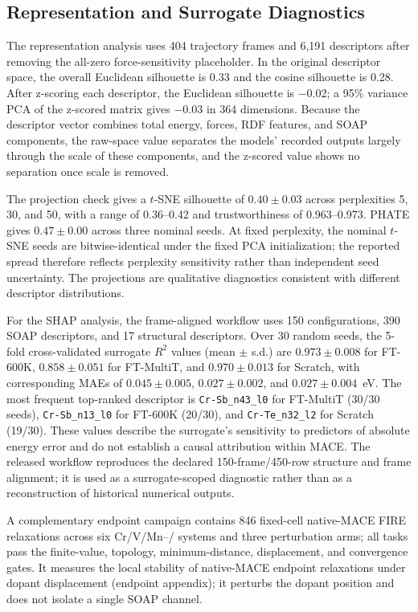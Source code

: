 \documentclass[pdflatex,sn-mathphys-num]{sn-jnl}%
\theoremstyle{thmstyleone}%
\theoremstyle{thmstyletwo}%
\theoremstyle{thmstylethree}%
\begin{document}
\subsection{Representation and Surrogate Diagnostics}


The representation analysis uses 404 trajectory frames and 6,191 descriptors after removing the all-zero force-sensitivity placeholder. In the original descriptor space, the overall Euclidean silhouette is 0.33 and the cosine silhouette is 0.28. After z-scoring each descriptor, the Euclidean silhouette is $-0.02$; a 95\% variance PCA of the z-scored matrix gives $-0.03$ in 364 dimensions. Because the descriptor vector combines total energy, forces, RDF features, and SOAP components, the raw-space value separates the models' recorded outputs largely through the scale of these components, and the z-scored value shows no separation once scale is removed.

The projection check gives a $t$-SNE silhouette of $0.40\pm0.03$ across perplexities 5, 30, and 50, with a range of 0.36--0.42 and trustworthiness of 0.963--0.973. PHATE gives $0.47\pm0.00$ across three nominal seeds. At fixed perplexity, the nominal $t$-SNE seeds are bitwise-identical under the fixed PCA initialization; the reported spread therefore reflects perplexity sensitivity rather than independent seed uncertainty. The projections are qualitative diagnostics consistent with different descriptor distributions.

For the SHAP analysis, the frame-aligned workflow uses 150 configurations, 390 SOAP descriptors, and 17 structural descriptors. Over 30 random seeds, the 5-fold cross-validated surrogate $R^2$ values (mean $\pm$ s.d.) are $0.973\pm0.008$ for FT-600K, $0.858\pm0.051$ for FT-MultiT, and $0.970\pm0.013$ for Scratch, with corresponding MAEs of $0.045\pm0.005$, $0.027\pm0.002$, and $0.027\pm0.004$~eV. The most frequent top-ranked descriptor is \texttt{Cr-Sb\_n43\_l0} for FT-MultiT (30/30 seeds), \texttt{Cr-Sb\_n13\_l0} for FT-600K (20/30), and \texttt{Cr-Te\_n32\_l2} for Scratch (19/30). These values describe the surrogate's sensitivity to predictors of absolute energy error and do not establish a causal attribution within MACE. The released workflow reproduces the declared 150-frame/450-row structure and frame alignment; it is used as a surrogate-scoped diagnostic rather than as a reconstruction of historical numerical outputs.

A complementary endpoint campaign contains 846 fixed-cell native-MACE FIRE relaxations across six Cr/V/Mn--/ systems and three perturbation arms; all tasks pass the finite-value, topology, minimum-distance, displacement, and convergence gates. It measures the local stability of native-MACE endpoint relaxations under dopant displacement (endpoint appendix); it perturbs the dopant position and does not isolate a single SOAP channel.
\end{document}
